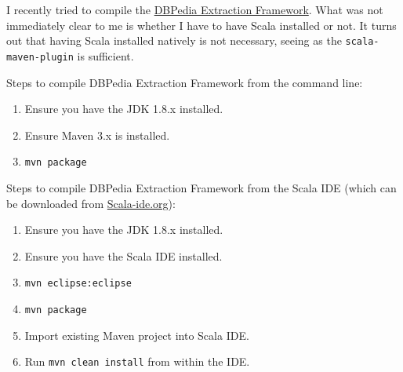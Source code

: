 \documentclass{amsart}
\title{}
\author{}
\date{}
\begin{document}
  \maketitle

  I recently tried to compile the \href{https://github.com/dbpedia/extraction-framework/}{DBPedia Extraction Framework}. What was not immediately clear to me is whether I have to have Scala installed or not. It turns out that having Scala installed natively is not necessary, seeing as the \texttt{scala-maven-plugin} is sufficient. 
  
  Steps to compile DBPedia Extraction Framework from the command line:
  \begin{enumerate}
   \item Ensure you have the JDK 1.8.x installed.
   \item Ensure Maven 3.x is installed.
   \item \texttt{mvn package} 
  \end{enumerate}

  Steps to compile DBPedia Extraction Framework from the Scala IDE (which can be downloaded from \href{http://scala-ide.org/}{Scala-ide.org}):
  \begin{enumerate}
   \item Ensure you have the JDK 1.8.x installed.
   \item Ensure you have the Scala IDE installed.
   \item \texttt{mvn eclipse:eclipse}
   \item \texttt{mvn package}
   \item Import existing Maven project into Scala IDE.
   \item Run \texttt{mvn clean install} from within the IDE.
  \end{enumerate}
  

  
  
  
  
 
\end{document}
